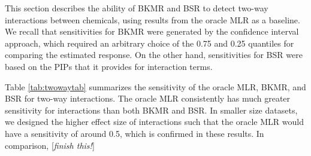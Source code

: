 \documentclass[12pt, twoside]{amherstthesis}
\begin{document}
This section describes the ability of BKMR and BSR to detect two-way interactions between chemicals, using results from the oracle MLR as a baseline. We recall that sensitivities for BKMR were generated by the confidence interval approach, which required an arbitrary choice of the 0.75 and 0.25 quantiles for comparing the estimated response. On the other hand, sensitivities for BSR were based on the PIPs that it provides for interaction terms.

Table \ref{tab:twowaytab} summarizes the sensitivity of the oracle MLR, BKMR, and BSR for two-way interactions. The oracle MLR consistently has much greater sensitivity for interactions than both BKMR and BSR. In smaller size datasets, we designed the higher effect size of interactions such that the oracle MLR would have a sensitivity of around 0.5, which is confirmed in these results. In comparison, {[}\emph{finish this!}{]}
\end{document}
